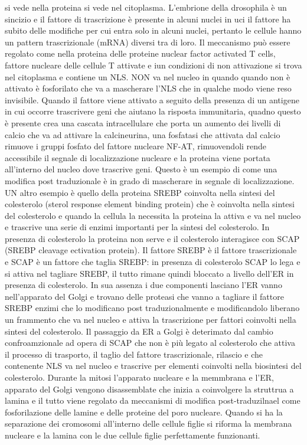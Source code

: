 si vede nella proteina si vede nel citoplasma. L'embrione della drosophila \`e un sincizio e il fattore di trascrizione \`e presente in alcuni nuclei in uci il fattore ha subito 
delle modifiche per cui entra solo in alcuni nuclei, pertanto le cellule hanno un pattern trascrizionale (mRNA) diversi tra di loro. Il meccanismo pu\`o essere regolato come nella 
proteina delle proteine nuclear factor activated T cells, fattore nucleare delle cellule T attivate e iun condizioni di non attivazione si trova nel citoplasma e contiene un NLS. NON
va nel nucleo in quando quando non \`e attivato \`e fosforilato che va a mascherare l'NLS che in qualche modo viene reso invisibile. Quando il fattore viene attivato a seguito della
presenza di un antigene in cui occorre trascrivere geni che aiutano la risposta immunitaria, quadno questo \`e presente crea una cascata intracellulare che porta un aumento dei livelli
di calcio che va ad attivare la calcineurina, una fosfatasi che attivata dal calcio rimuove i gruppi fosfato del fattore nucleare NF-AT, rimuovendoli rende accessibile il segnale di 
localizzazione nucleare e la proteina viene portata all'interno del nucleo dove trascrive geni. Questo \`e un esempio di come una modifica post traduzionale \`e in grado di mascherare
in segnale di localizzazione. UN altro esempio \`e quello della proteina SREBP coinvolta nella sintesi del colesterolo (sterol response element binding protein) che \`e coinvolta nella
sintesi del colesterolo e quando la cellula la necessita la proteina la attiva e va nel nucleo e trascrive una serie di enzimi importanti per la sintesi del colesterolo. In presenza di 
colesterolo la proteina non serve e il colesterolo interagisce con SCAP (SREBP cleavage ectivation protein). Il fattore SREBP \`e il fattore trascrizionale e SCAP \`e un fattore che 
taglia SREBP: in presenza di colesterolo SCAP lo lega e si attiva nel tagliare SREBP, il tutto rimane quindi bloccato a livello dell'ER in presenza di colesterolo. In sua assenza i 
due componenti lasciano l'ER vanno nell'apparato del Golgi e trovano delle proteasi che vanno a tagliare il fattore SREBP enzimi che lo modificano post traduzionalmente e modificandolo
liberano un frammento che va nel nucleo e attiva la trascrizione per fattori coinvolti nella sintesi del colesterolo. Il passaggio da ER a Golgi \`e deterimato dal cambio confroamzionale
ad opera di SCAP che non \`e pi\`u legato al colesterolo che attiva il processo di trasporto, il taglio del fattore trascrizionale, rilascio e che contenente NLS va nel nucleo e trascrive
per elementi coinvolti nella biosintesi del colesterolo. Durante la mitosi l'apparato nucleare e  la memmbrana e l'ER, apparato del Golgi vengono disassemblate che inizia a coinvolgere 
la struttrua a lamina e il tutto viene regolato da meccanismi di modifica post-traduzilnael come fosforilazione delle lamine e delle proteine del poro nucleare. Quando si ha la 
separazione dei cromosomi all'interno delle cellule figlie si riforma la membrana nucleare e la lamina con le due cellule figlie perfettamente funzionanti.
